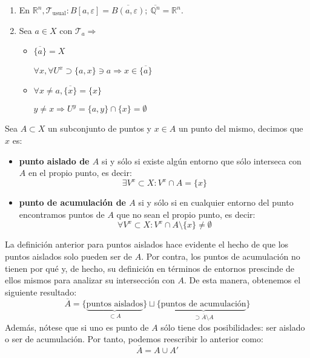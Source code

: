 \begin{ej}
\begin{enumerate}
    \item En $\mathbb{R}^n, \mathcal{T}_{\text{usual}}: B\left[ a, \varepsilon \right] = \overline{B \left( a, \varepsilon \right)};\ \overline{\mathbb{Q}^n} = \mathbb{R}^n$.
    \item Sea $a \in X$ con $\mathcal{T}_a \Rightarrow$
    \begin{itemize}
        \item $\overline{\{a\}} = X $
        \begin{demo}
            $\forall x, \forall U^x \supset \{a, x\} \ni a \Rightarrow x \in \overline{\{a\}}$
        \end{demo}
        \item $\forall x \neq a, \overline{\{x\}} = \{x\}$
        \begin{demo}
            $y \neq x \Rightarrow U^y = \{a, y\} \cap \{x\} = \emptyset$ 
        \end{demo}
    \end{itemize}
\end{enumerate}
\end{ej}

\begin{defi}[Acumulación]    
Sea $A\subset X$ un subconjunto de puntos y $x\in A$ un punto del mismo, decimos que $x$ es:
\begin{itemize}
\item \textbf{punto aislado de $A$} si y sólo si existe algún entorno que sólo interseca con $A$ en el propio punto, es decir:
$$
\exists V^x \subset X : V^x \cap A = \{x\}
$$
\item \textbf{punto de acumulación de $A$} si y sólo si en cualquier entorno del punto encontramos puntos de $A$ que no sean el propio punto, es decir:
$$
\forall V^x \subset X : V^x \cap A \setminus \{x\} \neq \emptyset
$$
\end{itemize}
\end{defi}

\begin{obs}
La definición anterior para puntos aislados hace evidente el hecho de que los puntos aislados solo pueden ser de $A$. Por contra, los puntos de acumulación no tienen por qué y, de hecho, su definición en términos de entornos prescinde de ellos mismos para analizar su intersección con $A$. De esta manera, obtenemos el siguiente resultado:
$$
\overline{A} = \{\underbrace{\text{puntos aislados}}_{\subset A}\} \sqcup \{\underbrace{\text{puntos de acumulación}}_{\supset \overline{A} \setminus A}\}
$$
Además, nótese que si uno es punto de $A$ sólo tiene dos posibilidades: ser aislado o ser de acumulación. Por tanto, podemos reescribir lo anterior como:
$$
\overline{A} = A \cup A'
$$
\end{obs}

